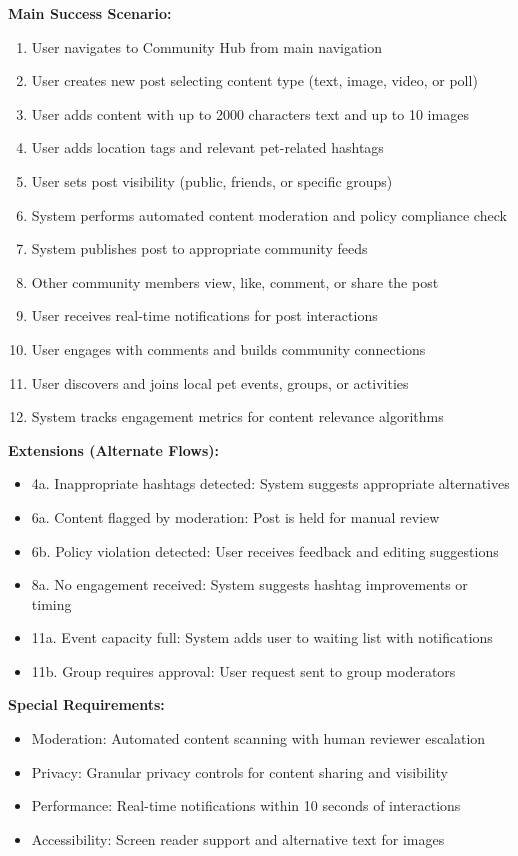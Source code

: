 \textbf{Main Success Scenario:}
\begin{enumerate}
    \item User navigates to Community Hub from main navigation
    \item User creates new post selecting content type (text, image, video, or poll)
    \item User adds content with up to 2000 characters text and up to 10 images
    \item User adds location tags and relevant pet-related hashtags
    \item User sets post visibility (public, friends, or specific groups)
    \item System performs automated content moderation and policy compliance check
    \item System publishes post to appropriate community feeds
    \item Other community members view, like, comment, or share the post
    \item User receives real-time notifications for post interactions
    \item User engages with comments and builds community connections
    \item User discovers and joins local pet events, groups, or activities
    \item System tracks engagement metrics for content relevance algorithms
\end{enumerate}

\textbf{Extensions (Alternate Flows):}
\begin{itemize}
    \item 4a. Inappropriate hashtags detected: System suggests appropriate alternatives
    \item 6a. Content flagged by moderation: Post is held for manual review
    \item 6b. Policy violation detected: User receives feedback and editing suggestions
    \item 8a. No engagement received: System suggests hashtag improvements or timing
    \item 11a. Event capacity full: System adds user to waiting list with notifications
    \item 11b. Group requires approval: User request sent to group moderators
\end{itemize}

\textbf{Special Requirements:}
\begin{itemize}
    \item Moderation: Automated content scanning with human reviewer escalation
    \item Privacy: Granular privacy controls for content sharing and visibility
    \item Performance: Real-time notifications within 10 seconds of interactions
    \item Accessibility: Screen reader support and alternative text for images
\end{itemize}


